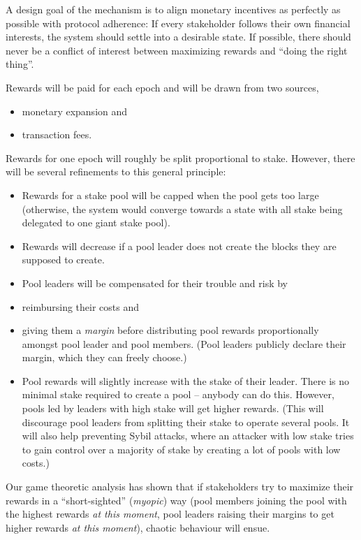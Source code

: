 \documentclass[11pt,a4paper]{article}
\begin{document}
A design goal of the mechanism is to align monetary incentives as
perfectly as possible with protocol adherence: If every stakeholder
follows their own financial interests, the system should settle into a
desirable state. If possible, there should never be a conflict of
interest between maximizing rewards and ``doing the right thing''.

Rewards will be paid for each epoch and will be drawn from two sources,

\begin{itemize}
\item
  monetary expansion and
\item
  transaction fees.
\end{itemize}

Rewards for one epoch will roughly be split proportional to stake.
However, there will be several refinements to this general principle:

\begin{itemize}
\item
  Rewards for a stake pool will be capped when the pool gets too large
  (otherwise, the system would converge towards a state with all stake
  being delegated to one giant stake pool).
\item
  Rewards will decrease if a pool leader does not create the blocks they
  are supposed to create.
\item
  Pool leaders will be compensated for their trouble and risk by
\item
  reimbursing their costs and
\item
  giving them a \emph{margin} before distributing pool rewards
  proportionally amongst pool leader and pool members. (Pool leaders
  publicly declare their margin, which they can freely choose.)
\item
  Pool rewards will slightly increase with the stake of their leader.
  There is no minimal stake required to create a pool -- anybody can do
  this. However, pools led by leaders with high stake will get higher
  rewards. (This will discourage pool leaders from splitting their stake
  to operate several pools. It will also help preventing Sybil attacks,
  where an attacker with low stake tries to gain control over a majority
  of stake by creating a lot of pools with low costs.)
\end{itemize}

Our game theoretic analysis has shown that if stakeholders try to
maximize their rewards in a ``short-sighted'' (\emph{myopic}) way (pool
members joining the pool with the highest rewards \emph{at this moment},
pool leaders raising their margins to get higher rewards \emph{at this
moment}), chaotic behaviour will ensue.
\end{document}
